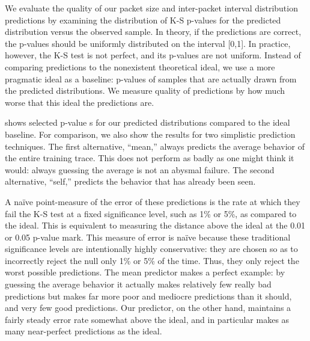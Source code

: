 \documentclass[conference]{IEEEtran}
\begin{document}

We evaluate the quality of our packet size and inter-packet interval distribution predictions by examining the distribution of K-S p-values for the predicted distribution versus the observed sample.
In theory, if the predictions are correct, the p-values should be uniformly distributed on the interval [0,1].
In practice, however, the K-S test is not perfect, and its p-values are not uniform.
Instead of comparing predictions to the nonexistent theoretical ideal, we use a more pragmatic ideal as a baseline:
p-values of samples that are actually drawn from the predicted distributions.
We measure quality of predictions by how much worse that this ideal the predictions are.\ksidealnote

 shows selected p-value s for our predicted distributions compared to the ideal baseline.
For comparison, we also show the results for two simplistic prediction techniques.
The first alternative, ``mean,'' always predicts the average behavior of the entire training trace.
This does not perform as badly as one might think it would:
always guessing the average is not an abysmal failure.
The second alternative, ``self,'' predicts the behavior that has already been seen.

A na\"ive point-measure of the error of these predictions is the rate at which they fail the K-S test at a fixed significance level, such as 1\% or 5\%, as compared to the ideal.
This is equivalent to measuring the distance above the ideal  at the 0.01 or 0.05 p-value mark.
This measure of error is na\"ive because these traditional significance levels are intentionally highly conservative:
they are chosen so as to incorrectly reject the null only 1\% or 5\% of the time.
Thus, they only reject the worst possible predictions.
The mean predictor makes a perfect example:
by guessing the average behavior it actually makes relatively few really bad predictions but makes far more poor and mediocre predictions than it should, and very few good predictions.
Our predictor, on the other hand, maintains a fairly steady error rate somewhat above the ideal, and in particular makes as many near-perfect predictions as the ideal.
\end{document}
